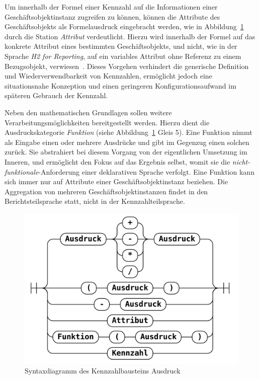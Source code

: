 \documentclass[
  language=german, %
  type=bachelor,%
  ngerman
]{isthesis}
\begin{document}
\begin{content}
	
  Um innerhalb der Formel einer Kennzahl auf die Informationen einer
  Geschäftsobjektinstanz zugreifen zu können, können die Attribute des
  Geschäftsobjekts als Formelausdruck eingebracht werden, wie in
  Abbildung~\ref{railroad-kennzahl} durch die Station \textit{Attribut}
  verdeutlicht. Hierzu wird innerhalb der Formel auf das konkrete Attribut
  eines bestimmten Geschäftsobjekts, und nicht, wie in der Sprache \textit{H2
  for Reporting}, auf ein variables Attribut ohne Referenz zu einem
  Bezugsobjekt, verwiesen~\cite[][S.  20]{becker2007h2}. Dieses Vorgehen
  verhindert die generische Definition und Wiederverwendbarkeit von Kennzahlen,
  ermöglicht jedoch eine situationsnahe Konzeption und einen geringeren
  Konfigurationsaufwand im späteren Gebrauch der Kennzahl.

	Neben den mathematischen Grundlagen sollen weitere Verarbeitungsmöglichkeiten
	bereitgestellt werden. Hierzu dient die Ausdruckskategorie \textit{Funktion}
	(siehe Abbildung~\ref{railroad-kennzahl} Gleis 5). Eine Funktion nimmt als
	Eingabe einen oder mehrere Ausdrücke und gibt im Gegenzug einen solchen
	zurück. Sie abstrahiert bei diesem Vorgang von der eigentlichen Umsetzung im
	Inneren, und ermöglicht den Fokus auf das Ergebnis selbst, womit sie die
	\textit{nicht-funktionale}-Anforderung einer deklarativen Sprache verfolgt.
	Eine Funktion kann sich immer nur auf Attribute einer Geschäftsobjektinstanz
	beziehen. Die Aggregation von mehreren Geschäftsobjektinstanzen findet in den
	Berichtsteilsprache statt, nicht in der Kennzahlteilsprache.


  \begin{figure}
    \includegraphics[scale=0.25]{content/figures/railroad-kennzahl.png}
    \caption[Syntaxdiagramm des Kennzahlbausteins Ausdruck]{Syntaxdiagramm des Kennzahlbausteins Ausdruck\protect\footnotemark}\label{railroad-kennzahl}
  \end{figure}


\end{content}
\end{document}
